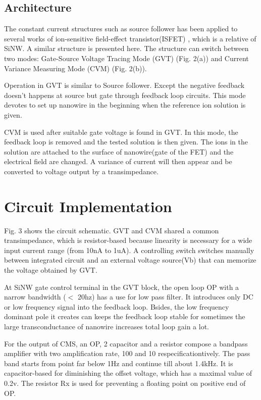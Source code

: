 \documentclass{article}
\begin{document}
\subsection{Architecture}
The constant current structures such as source follower has been applied to several works of ion-sensitive field-effect transistor(ISFET) \cite{J6}, which is a relative of SiNW.
A similar structure is presented here. The structure can switch between two modes: Gate-Source Voltage Tracing Mode (GVT) (Fig. 2(a)) and Current Variance Measuring Mode (CVM) (Fig. 2(b)).

Operation in GVT is similar to Source follower.
Except the negative feedback doesn’t happens at source but gate through feedback loop circuits.
This mode devotes to set up nanowire in the beginning when the reference ion solution is given.

CVM is used after suitable gate voltage is found in GVT.
In this mode, the feedback loop is removed and the tested solution is then given.
The ions in the solution are attached to the surface of nanowire(gate of the FET) and the electrical field are changed.
A variance of current will then appear and be converted to voltage output by a transimpedance.


\section{Circuit Implementation}
Fig. 3 shows the circuit schematic.
GVT and CVM shared a common transimpedance, which is resistor-based because linearity is necessary for a wide input current range (from 10nA to 1uA).
A controlling switch switches manually between integrated circuit and an external voltage source(Vb) that can memorize the voltage obtained by GVT.

At SiNW gate control terminal in the GVT block, the open loop OP with a narrow bandwidth ($<$ 20hz) has a use for low pass filter.
It introduces only DC or low frequency signal into the feedback loop.
Bsides, the low frequency dominant pole it creates can keeps the feedback loop stable for sometimes the large transconductance of nanowire increases total loop gain a lot.

For the output of CMS, an OP, 2 capacitor and a resistor compose a bandpass amplifier with two amplification rate, 100 and 10 respecificationtively.
The pass band starts from point far below 1Hz and continue till about 1.4kHz.
It is capacitor-based for diminishing the offset voltage, which has a maximal value of 0.2v.
The resistor Rx is used for preventing a floating point on positive end of OP.
\end{document}
